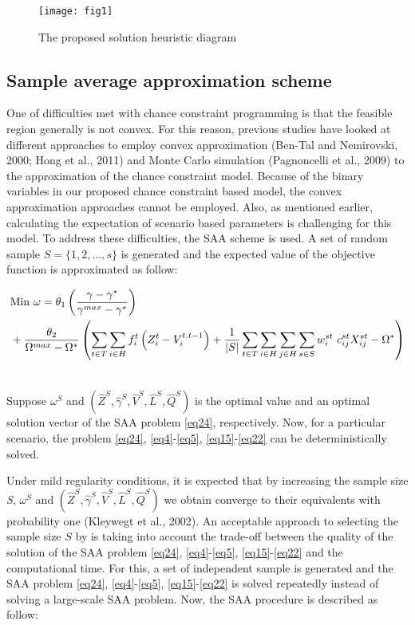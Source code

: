 \documentclass[review]{elsarticle}
\begin{document}
\begin{figure}[h!]
\centering
\texttt{[image: fig1]}
\caption{The proposed solution heuristic diagram}\label{fig1}
\end{figure}

\subsection{Sample average approximation scheme}

One of difficulties met with chance constraint programming is that the feasible region generally is not convex. For this reason, previous studies have looked at different approaches to employ convex approximation (Ben-Tal and Nemirovski, 2000; Hong et al., 2011) and Monte Carlo simulation (Pagnoncelli et al., 2009) to the approximation of the chance constraint model. Because of the binary variables in our proposed chance constraint based model, the convex approximation approaches cannot be employed. Also, as mentioned earlier, calculating the expectation of scenario based parameters is challenging for this model. To address these difficulties, the SAA scheme is used. A set of random sample $S=\{1, 2, \ldots ,s\}$ is generated and the expected value of the objective function is approximated as follow:

\begin{align}\label{eq24}
&{\rm Min}~\omega ={\theta }_1\left(\frac{\gamma -{\gamma }^*}{{\gamma }^{max}-{\gamma }^*}\right)\nonumber\\
&+\frac{\theta_2}{{\Omega }^{max}-{\Omega }^*} \left( {\sum_{t\in T}{\sum_{i\in H}{f^t_i\left(Z^t_i-V^{t,t-1}_i\right)}}+\frac{1}{|S|}\sum_{t\in T}{\sum_{i\in H}{\sum_{j\in H}{\sum_{s\in S}{w^{st}_i{\ c}^{st}_{ij}X^{st}_{ij}}}}}-{\Omega }^*}\right)\nonumber\\
&
\end{align}

Suppose $\omega ^{S} $ and $(\widehat{Z}^{S} ,\widehat{\gamma }^{S} ,\widehat{V}^{S} ,\widehat{L}^{S} ,\widehat{Q}^{S} )$ is the optimal value and an optimal solution vector of the SAA problem \eqref{eq24}, respectively. Now, for a particular scenario, the problem \eqref{eq24}, \eqref{eq4}-\eqref{eq5}, \eqref{eq15}-\eqref{eq22} can be deterministically solved. 

Under mild regularity conditions, it is expected that by increasing the sample size \textbar \textit{S}\textbar , $\omega ^{S} $ and $(\widehat{Z}^{S} ,\widehat{\gamma }^{S} ,\widehat{V}^{S} ,\widehat{L}^{S} ,\widehat{Q}^{S} )$ we obtain converge to their equivalents with probability one (Kleywegt et al., 2002). An acceptable approach to selecting the sample size $S$  by is taking into account the trade-off between the quality of the solution of the SAA problem \eqref{eq24}, \eqref{eq4}-\eqref{eq5}, \eqref{eq15}-\eqref{eq22} and the computational time. For this, a set of independent sample is generated and the SAA problem \eqref{eq24}, \eqref{eq4}-\eqref{eq5}, \eqref{eq15}-\eqref{eq22} is solved repeatedly instead of solving a large-scale SAA problem. Now, the SAA procedure is described as follow:
\end{document}
